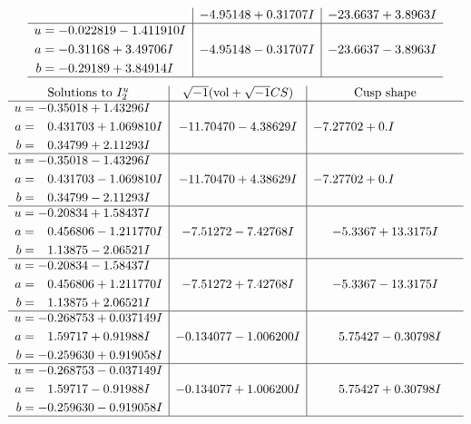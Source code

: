 \documentclass[1p]{elsarticle_modified}
\theoremstyle{definition}
\newcommand{\I}{\sqrt{-1}}
\begin{document}
$$\begin{array}{c|c|c}
 & -4.95148 + 0.31707 I & -23.6637 + 3.8963 I \\ \hline\begin{aligned}
u &= -0.022819 - 1.411910 I \\
a &= -0.31168 + 3.49706 I \\
b &= -0.29189 + 3.84914 I\end{aligned}
 & -4.95148 - 0.31707 I & -23.6637 - 3.8963 I\\
 \hline 
 \end{array}$$\newpage$$\begin{array}{c|c|c}  
\text{Solutions to }I^u_{2}& \I (\text{vol} + \sqrt{-1}CS) & \text{Cusp shape}\\
 \hline 
\begin{aligned}
u &= -0.35018 + 1.43296 I \\
a &= \phantom{-}0.431703 + 1.069810 I \\
b &= \phantom{-}0.34799 + 2.11293 I\end{aligned}
 & -11.70470 - 4.38629 I & -7.27702 + 0. I\phantom{ +0.000000I} \\ \hline\begin{aligned}
u &= -0.35018 - 1.43296 I \\
a &= \phantom{-}0.431703 - 1.069810 I \\
b &= \phantom{-}0.34799 - 2.11293 I\end{aligned}
 & -11.70470 + 4.38629 I & -7.27702 + 0. I\phantom{ +0.000000I} \\ \hline\begin{aligned}
u &= -0.20834 + 1.58437 I \\
a &= \phantom{-}0.456806 - 1.211770 I \\
b &= \phantom{-}1.13875 - 2.06521 I\end{aligned}
 & -7.51272 - 7.42768 I & -5.3367 + 13.3175 I \\ \hline\begin{aligned}
u &= -0.20834 - 1.58437 I \\
a &= \phantom{-}0.456806 + 1.211770 I \\
b &= \phantom{-}1.13875 + 2.06521 I\end{aligned}
 & -7.51272 + 7.42768 I & -5.3367 - 13.3175 I \\ \hline\begin{aligned}
u &= -0.268753 + 0.037149 I \\
a &= \phantom{-}1.59717 + 0.91988 I \\
b &= -0.259630 + 0.919058 I\end{aligned}
 & -0.134077 - 1.006200 I & \phantom{-}5.75427 - 0.30798 I \\ \hline\begin{aligned}
u &= -0.268753 - 0.037149 I \\
a &= \phantom{-}1.59717 - 0.91988 I \\
b &= -0.259630 - 0.919058 I\end{aligned}
 & -0.134077 + 1.006200 I & \phantom{-}5.75427 + 0.30798 I\\
 \hline 
 \end{array}$$\newpage
\end{document}
